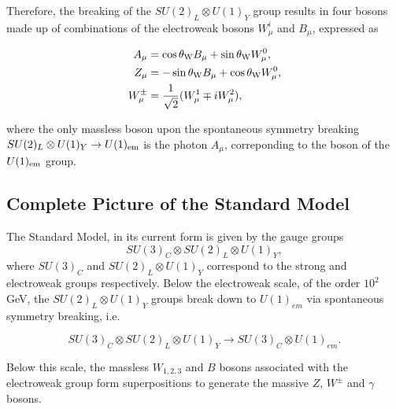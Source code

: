 \documentclass{article}
\begin{document}
Therefore, the breaking of the $SU(2)_L \otimes U(1)_Y$ group results in four bosons made up of combinations of the electroweak bosons $W^{i}_\mu$ and $B _\mu$, expressed as

\begin{equation}
\begin{split}
A_\mu & = \cos\theta_{\rm{W}} B_\mu + \sin\theta_{\rm{W}}W^{0}_\mu, \\
Z_\mu & = -\sin\theta_{\rm{W}} B_\mu + \cos\theta_{\rm{W}}W^{0}_\mu,\\
W^{\pm}_\mu & = \frac{1}{\sqrt{2}}(W^{1}_\mu \mp iW^{2}_\mu),
\end{split}
\end{equation}

where the only massless boson upon the spontaneous symmetry breaking $SU(2)_L \otimes U(1)_Y\rightarrow U(1)_{\rm{em}}$ is the photon $A_\mu$, correponding to the boson of the $U(1)_{\rm{em}}$ group.
\subsection{Complete Picture of the Standard Model}%
\label{sec:SM_SM}
The Standard Model, in its current form is given by the gauge groups 
\begin{equation}
    SU(3)_C \otimes SU(2)_L \otimes U(1)_Y,
\end{equation}
where $SU(3)_C$ and $SU(2)_L \otimes U(1)_Y$ correspond to the strong and electroweak groups respectively. Below the electroweak scale, of the order $10^{2}\,$GeV, the $SU(2)_L \otimes U(1)_Y$ groups break down to $U(1)_{em}$ via spontaneous symmetry breaking, i.e. 

\begin{equation}
SU(3)_C \otimes SU(2)_L \otimes U(1)_Y \rightarrow SU(3)_C \otimes U(1)_{em}.
\end{equation}

Below this scale, the massless $W_{1,2,3}$ and $B$ bosons associated with the electroweak group form superpositions to generate the massive $Z$, $W^{\pm}$ and $\gamma$ bosons.
\end{document}
